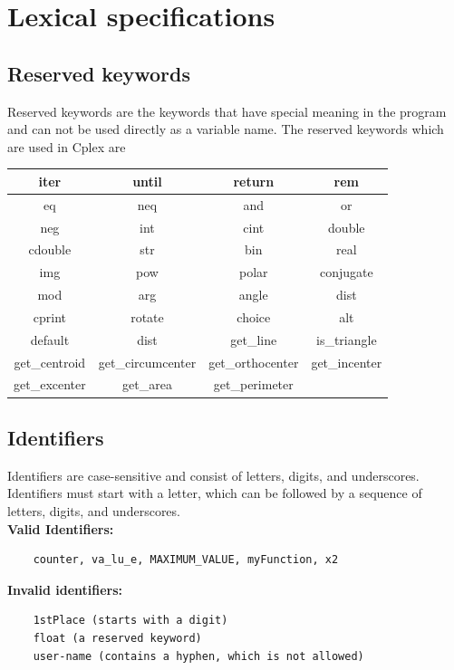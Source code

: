 \documentclass[12pt]{article}
\begin{document}
\section{Lexical specifications}

\subsection{Reserved keywords}
Reserved keywords are the keywords that have special meaning in the program and can not be used directly as a variable name. The reserved keywords which are used in Cplex are

\begin{table}[h]
    \centering
    \renewcommand{\arraystretch}{1.5} %
    \setlength{\tabcolsep}{15pt} %
    \begin{tabular}{|c|c|c|c|}
        \hline
        iter & until & return & rem \\
        \hline
        eq & neq & and & or \\
        \hline
        neg & int & cint & double \\
        \hline
        cdouble & str & bin & real \\
        \hline
        img & pow & polar & conjugate \\
        \hline
        mod & arg & angle & dist \\
        \hline
        cprint & rotate & choice & alt \\
        \hline
        default & dist & get\_line & is\_triangle \\
        \hline
        get\_centroid & get\_circumcenter & get\_orthocenter & get\_incenter \\
        \hline
        get\_excenter & get\_area & get\_perimeter & \\
        \hline
    \end{tabular}
\end{table}

\subsection{Identifiers}
Identifiers are case-sensitive and consist of letters, digits, and underscores. Identifiers must start with a letter, which can be followed by a sequence of letters, digits, and underscores.\\

\textbf{Valid Identifiers:} 
\begin{verbatim}
    counter, va_lu_e, MAXIMUM_VALUE, myFunction, x2
\end{verbatim}
\textbf{Invalid identifiers:} 
\begin{verbatim}
    1stPlace (starts with a digit)
    float (a reserved keyword)
    user-name (contains a hyphen, which is not allowed)
\end{verbatim}
\end{document}
